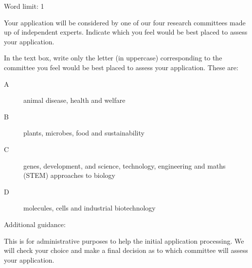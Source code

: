 
\begin{instruction}
Word limit: 1

Your application will be considered by one of our four research committees
made up of independent experts. Indicate which you feel would be best placed
to assess your application.

In the text box, write only the letter (in uppercase) corresponding to the
committee you feel would be best placed to assess your application. These are:

\begin{description}

    \item[A] animal disease, health and welfare

    \item[B] plants, microbes, food and sustainability

    \item[C] genes, development, and science, technology, engineering and maths
    (STEM) approaches to biology

    \item[D] molecules, cells and industrial biotechnology

\end{description}

Additional guidance:

This is for administrative purposes to help the initial application processing.
We will check your choice and make a final decision as to which committee will
assess your application.

\end{instruction}
